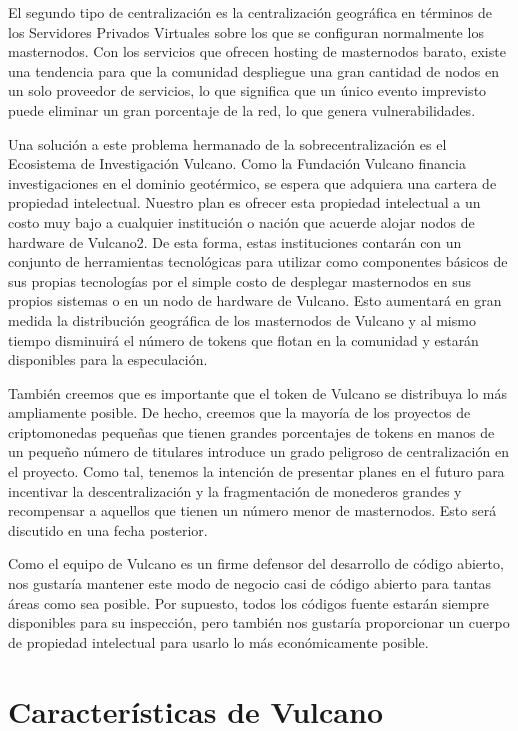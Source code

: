 \documentclass[A4paper, 12pt]{article}
\begin{document}
El segundo tipo de centralización es la centralización geográfica en términos de los Servidores Privados Virtuales sobre los que se configuran normalmente los masternodos. Con los servicios que ofrecen hosting de masternodos barato, existe una tendencia para que la comunidad despliegue una gran cantidad de nodos en un solo proveedor de servicios, lo que significa que un único evento imprevisto puede eliminar un gran porcentaje de la red, lo que genera vulnerabilidades.

Una solución a este problema hermanado de la sobrecentralización es el Ecosistema de Investigación Vulcano. Como la Fundación Vulcano financia investigaciones en el dominio geotérmico, se espera que adquiera una cartera de propiedad intelectual. Nuestro plan es ofrecer esta propiedad intelectual a un costo muy bajo a cualquier institución o nación que acuerde alojar nodos de hardware de Vulcano2. De esta forma, estas instituciones contarán con un conjunto de herramientas tecnológicas para utilizar como componentes básicos de sus propias tecnologías por el simple costo de desplegar masternodos en sus propios sistemas o en un nodo de hardware de Vulcano. Esto aumentará en gran medida la distribución geográfica de los masternodos de Vulcano y al mismo tiempo disminuirá el número de tokens que flotan en la comunidad y estarán disponibles para la especulación.

También creemos que es importante que el token de Vulcano se distribuya lo más ampliamente posible. De hecho, creemos que la mayoría de los proyectos de criptomonedas pequeñas que tienen grandes porcentajes de tokens en manos de un pequeño número de titulares introduce un grado peligroso de centralización en el proyecto. Como tal, tenemos la intención de presentar planes en el futuro para incentivar la descentralización y la fragmentación de monederos grandes y recompensar a aquellos que tienen un número menor de masternodos.  Esto será discutido en una fecha posterior.

Como el equipo de Vulcano es un firme defensor del desarrollo de código abierto, nos gustaría mantener este modo de negocio casi de código abierto para tantas áreas como sea posible.  Por supuesto, todos los códigos fuente estarán siempre disponibles para su inspección, pero también nos gustaría proporcionar un cuerpo de propiedad intelectual para usarlo lo más económicamente posible.

\section{Características de Vulcano}
\end{document}
